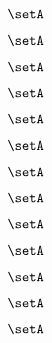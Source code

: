 \begin{forslides}
    \begin{equation}
        \label{eq:slides-processes-119}
        \setA
    \end{equation}
    
    \begin{equation}
        \label{eq:slides-processes-120}
        \setA
    \end{equation}

    \begin{equation}
        \label{eq:slides-processes-121}
        \setA
    \end{equation}

    \begin{equation}
        \label{eq:slides-processes-122}
        \setA
    \end{equation}

    \begin{equation}
        \label{eq:slides-processes-123}
        \setA
    \end{equation}

    \begin{equation}
        \label{eq:slides-processes-124}
        \setA
    \end{equation}

    \begin{equation}
        \label{eq:slides-processes-125}
        \setA
    \end{equation}

    \begin{equation}
        \label{eq:slides-processes-126}
        \setA
    \end{equation}

    \begin{equation}
        \label{eq:slides-processes-127}
        \setA
    \end{equation}

    \begin{equation}
        \label{eq:slides-processes-128}
        \setA
    \end{equation}

    \begin{equation}
        \label{eq:slides-processes-129}
        \setA
    \end{equation}
    
    \begin{equation}
        \label{eq:slides-processes-130}
        \setA
    \end{equation}

    \begin{equation}
        \label{eq:slides-processes-131}
        \setA
    \end{equation}


\end{forslides}

